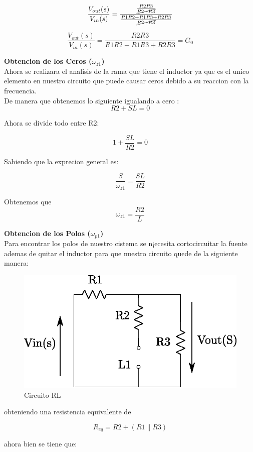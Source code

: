 \documentclass[12pt,letterpaper]{IEEEtran}
\begin{document}
	$$\frac{V_{out}(s)}{V_{in}(s)}=\frac{\frac{R2 R3}{\cancel{R2+R3}}}{\frac{R1R2+R1R3+R2 R3}{\cancel{R2+R3}}}$$
	
	
	
	$$\frac{V_{out}(s)}{V_{in}(s)}=\frac{R2R3}{R1R2+R1R3+R2R3}=G_0$$
	
	
	
	\textbf{Obtencion de los Ceros ($\omega_{z1}$)}\\
	Ahora se realizara el analisis de la rama que tiene el inductor ya que es el unico elemento en nuestro circuito que puede causar ceros debido a su reaccion con la frecuencia.\\
	De manera que obtenemos lo siguiente igualando a cero :\\
	
	$$R2+SL=0$$
	
	
	Ahora se divide todo entre R2:
	
	$$1+\frac{SL}{R2}=0$$
	
	Sabiendo que la exprecion general es:
	
	$$\frac{S}{\omega _{z1}}=\frac{SL}{R2} $$
	
	Obtenemos que $$\omega _{z1}=\frac{R2}{L}$$
	
	\textbf{Obtencion de los Polos ($\omega_{p1}$)}\\
	Para encontrar los polos de nuestro cistema se n¡ecesita cortocircuitar la fuente ademas de quitar el inductor para que nuestro circuito quede de la siguiente manera:\\
	
	\begin{figure}[h!]
		\centering
		\includegraphics[width=0.7\linewidth]{Circuito3}
		\caption{Circuito RL}
		\label{fig:circuito3}
	\end{figure}
	
	
	
	obteniendo una resistencia equivalente de 
	
	$$R_{eq}=R2+(R1\parallel R3)$$
	
	ahora bien se tiene que:
	
\end{document}
